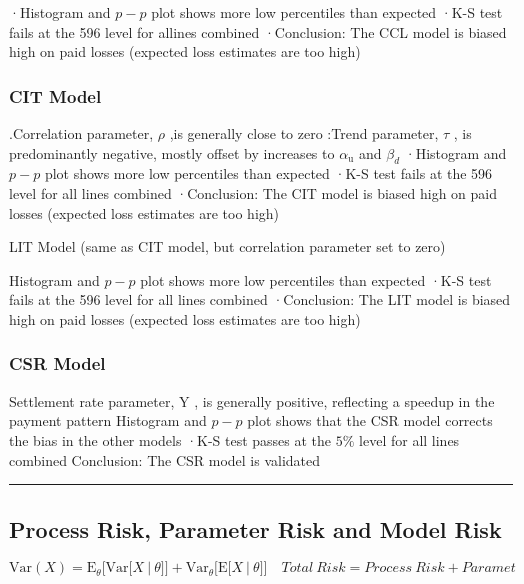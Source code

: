 \documentclass[
]{article}
\begin{document}
·Histogram and \(p-p\) plot shows more low percentiles than expected
·K-S test fails at the 596 level for allines combined ·Conclusion: The
CCL model is biased high on paid losses (expected loss estimates are too
high)

\subsubsection{CIT Model}\label{cit-model}

.Correlation parameter, \(\rho\) ,is generally close to zero :Trend
parameter, \(\tau\) , is predominantly negative, mostly offset by
increases to \(\alpha_{\mathrm{u}}\) and \(\beta_{d}\) ·Histogram and
\(p-p\) plot shows more low percentiles than expected ·K-S test fails at
the 596 level for all lines combined ·Conclusion: The CIT model is
biased high on paid losses (expected loss estimates are too high)

LIT Model (same as CIT model, but correlation parameter set to zero)

Histogram and \(p-p\) plot shows more low percentiles than expected ·K-S
test fails at the 596 level for all lines combined ·Conclusion: The LIT
model is biased high on paid losses (expected loss estimates are too
high)

\subsubsection{CSR Model}\label{csr-model}

Settlement rate parameter, Y , is generally positive, reflecting a
speedup in the payment pattern Histogram and \(p-p\) plot shows that the
CSR model corrects the bias in the other models ·K-S test passes at the
\(5\%\) level for all lines combined Conclusion: The CSR model is
validated

\begin{center}\rule{0.5\linewidth}{0.5pt}\end{center}

\subsection{Process Risk, Parameter Risk and Model
Risk}\label{process-risk-parameter-risk-and-model-risk}

\[\mathrm{Var}(X)=\mathrm{E}_{\theta}\Big[\mathrm{Var}\Big[X\:|\:\theta\Big]\Big]+\mathrm{Var}_{\theta}\Big[\mathrm{E}\Big[X\:|\:\theta\Big]\Big]\quad Total\:Risk=Process\:Risk+Paramet\]
\end{document}
